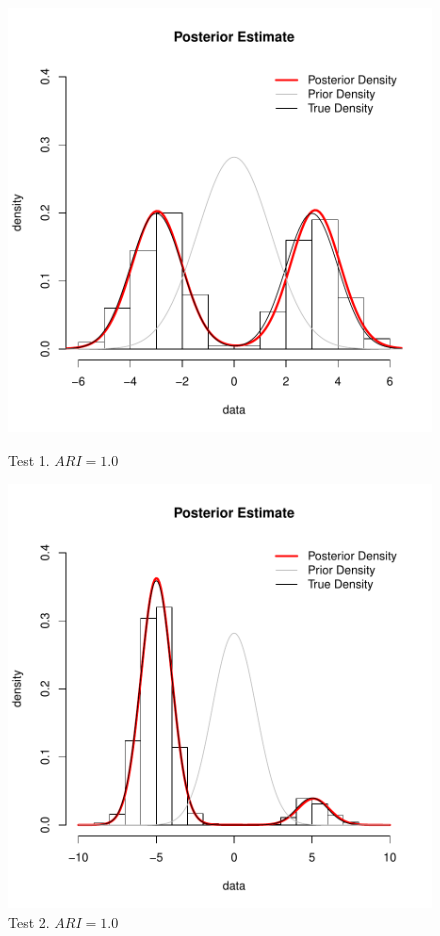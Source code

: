 \begin{figure}[h]
	\centering
	\begin{minipage}{0.5\textwidth}
		\includegraphics[scale=0.45]{etc/test1.pdf}
		\captionsetup{labelformat=empty}
		\caption{Test 1. $ARI = 1.0$}
	\end{minipage}%
	\begin{minipage}{0.5\textwidth}
		\includegraphics[scale=0.45]{etc/test2.pdf}
		\captionsetup{labelformat=empty}
		\caption{Test 2. $ARI = 1.0$}
	\end{minipage}
\end{figure}

